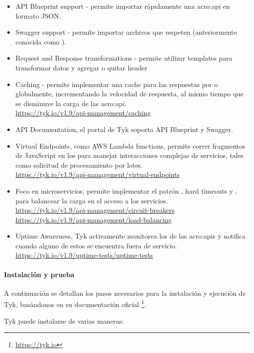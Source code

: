 \begin{itemize}
  \item API Blueprint support - permite importar rápidamente una \gls{acro:api} en formato JSON.
  \item Swagger support - permite importar archivos que respeten  (anteriormente conocida como ).
  \item Request and Response transformations - permite utilizar templates para transformar datos y agregar o quitar header 
  \item Caching - permite implementar una cache para las respuestas por  o globalmente, incrementando la velocidad de respuesta, al mismo tiempo que se disminuye la carga de las \gls{acro:api}. \\
  \url{https://tyk.io/v1.9/api-management/caching}
  \item API Documentation, el portal de Tyk soporta API Blueprint y Swagger.
  \item Virtual Endpoints, como AWS Lambda functions, permite correr fragmentos de JavaScript en los  para manejar interacciones complejas de servicios, tales como solicitud de procesamiento por lotes. \\
  \url{https://tyk.io/v1.9/api-management/virtual-endpoints}
  \item Foco en microservicios, permite implementar el patrón , hard timeouts y , para balancear la carga en el acceso a los servicios. \\
  \url{https://tyk.io/v1.9/api-management/circuit-breakers} \\
  \url{https://tyk.io/v1.9/api-management/load-balancing}
  \item Uptime Awareness, Tyk activamente monitorea los  de las \glspl{acro:api} y notifica cuando alguno de estos se encuentra fuera de servicio. \\
  \url{https://tyk.io/v1.9/uptime-tests/uptime-tests}
\end{itemize}

\paragraph{Instalación y prueba}

A continuación se detallan los pasos necesarios para la instalación y ejecución de Tyk, basándonos en su documentación oficial \footnote{\url{https://tyk.io}}.

Tyk puede instalarse de varias maneras:

